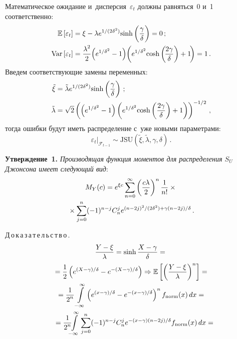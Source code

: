 \begin{multicols}{2}
  Математическое ожидание и~дисперсия~$\varepsilon_t$ должны равняться~0 
и~1 соответственно:
  \begin{align*}
  \mathbb{E}\left[\varepsilon_t\right]&=\xi-\lambda 
e^{1/(2\delta^2)}\mathrm{sinh}\left(\displaystyle\frac{\displaystyle \gamma\mathstrut}{\displaystyle \delta\mathstrut}\right)=0\,;\\
  \mathrm{Var}\left[ \varepsilon_t\right] &= \displaystyle\frac{\displaystyle \lambda^2\mathstrut}{\displaystyle 2\mathstrut}\!\left( 
  e^{1/\delta^2}-1\right)\! 
\left( e^{1/\delta^2} \mathrm{cosh}\left(\!\displaystyle\frac{\displaystyle 2\gamma\mathstrut}{\displaystyle \delta\mathstrut}\right)+1\!\right)=1\,.
  \end{align*}
  Введем соответствующие замены переменных: 
  \begin{align*}
  \tilde{\xi} &=\tilde{\lambda} e^{1/(2\delta^2)}\mathrm{sinh}\left( 
\displaystyle\frac{\displaystyle \gamma\mathstrut}{\displaystyle \delta\mathstrut}\right)\,;\\
  \tilde{\lambda} &= \sqrt{2}\left(\left( e^{1/\delta^2} -1\right) \left( e^{1/\delta^2} 
\mathrm{cosh}\left(\displaystyle\frac{\displaystyle 2\gamma\mathstrut}{\displaystyle \delta\mathstrut}\right)+1\right)\right)^{-1/2}\,,
  \end{align*} 
  тогда ошибки будут иметь распределение с~уже новыми параметрами: 
  $$
  \varepsilon_t\vert_{\mathcal{F}_{t-1}}\sim \mathrm{JSU} \left( \tilde{\xi},\tilde{\lambda}, 
\gamma, \delta\right)\,.
  $$

\smallskip

\noindent
\textbf{Утверждение~1.} \textit{Производящая функция моментов для 
распределения $S_U$ Джонсона имеет следующий вид}:
\begin{multline*}
M_Y(c)=e^{\xi c} \sum\limits^\infty_{n=0} \left( \displaystyle\frac{\displaystyle c\lambda\mathstrut}{\displaystyle 2\mathstrut}\right)^n \displaystyle\frac{\displaystyle 1\mathstrut}{\displaystyle n!\mathstrut}
\times{}\\
{}\times \sum\limits^n_{j=0} (-1)^{n-j} 
C_n^j e^{(n-2j)^2/({2\delta^2})+ \gamma(n-
2j)/\delta}\,.
\end{multline*}


\noindent
Д\,о\,к\,а\,з\,а\,т\,е\,л\,ь\,с\,т\,в\,о\,. 
\begin{multline*}
\displaystyle\frac{\displaystyle Y-\xi\mathstrut}{\displaystyle \lambda\mathstrut}=\mathrm{sinh}\,\displaystyle\frac{\displaystyle X-\gamma\mathstrut}{\displaystyle \delta\mathstrut}={}\\
{}=\displaystyle\frac{\displaystyle 1\mathstrut}{\displaystyle 2\mathstrut} \left( 
e^{({X-\gamma})/{\delta}}-e^{-({X-\gamma})/{\delta}}\right)
\Rightarrow \mathbb{E}\left[ \left( \displaystyle\frac{\displaystyle Y-\xi\mathstrut}{\displaystyle \lambda\mathstrut}\right)^n\right]={}\\
{}= \displaystyle\frac{\displaystyle 1\mathstrut}{\displaystyle 2^n\mathstrut}\int\limits^\infty_{-\infty} \left( 
e^{({x-\gamma})/{\delta}}-
e^{-({x-\gamma})/{\delta}}\right)^n f_{\mathrm{norm}}(x)\,dx={}\\
{}= \displaystyle\frac{\displaystyle 1\mathstrut}{\displaystyle 2^n\mathstrut}\!\!\! \int\limits_{-\infty}^\infty 
\sum\limits^n_{j=0} (-1)^{n-j} C_n^j 
e^{-{(x-\gamma)(n-2j)}/{\delta}} f_{\mathrm{norm}}(x)\,dx={}\hspace*{-9.6583pt}
\end{multline*}


\end{multicols}
